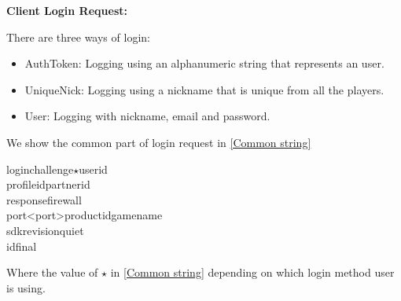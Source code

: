 \documentclass[oneside,titlepage,a4paper]{Definition/retrospy} %
\begin{document}
\begin{flushleft}
	\textbf{Client Login Request:\\}
\end{flushleft}
There are three ways of login:
\begin{itemize}
	\item AuthToken: Logging using an alphanumeric string that represents an user.
	\item 	UniqueNick: Logging using a nickname that is unique from all the players.
	\item User: Logging with nickname, email and password.
\end{itemize}
We show the common part of login request in \ref{Common string}

\begin{mybox}[label=Common string]
	\tbs login\tbs\tbs challenge\tbs<challenge string>\tbs $\star$\tbs userid\tbs<user id>\\
	\tbs profileid\tbs <profile id>\tbs partnerid\tbs<partner id>\\
	\tbs response\tbs<challenge response string>\tbs firewall\tbs<firewall flag>\\\tbs port\tbs<port>\tbs productid\tbs<product id>\tbs gamename\tbs<game name>\\\tbs sdkrevision\tbs<sdk revision number>\tbs quiet\tbs<quiet mode flag>\\\tbs id\tbs<operation id>\tbs final\tbs
\end{mybox}

Where the value of $ \star $ in \ref{Common string} depending on which login method user is using.
\end{document}

